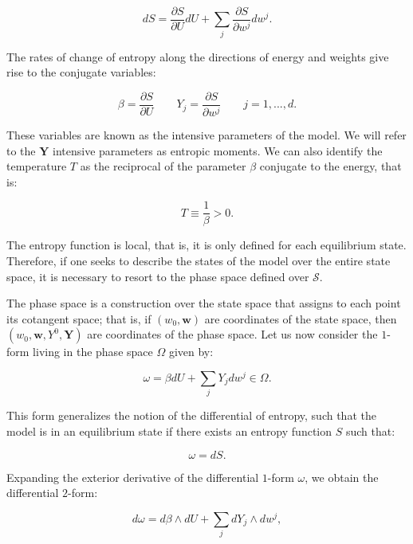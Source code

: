 \documentclass[12pt]{article}
\begin{document}
\begin{equation}
dS = \frac{\partial S}{\partial U} dU + \sum_{j} \frac{\partial S}{\partial w^{j}}dw^{j}.
\end{equation}

The rates of change of entropy along the directions of energy and weights give rise to the conjugate variables:

\begin{equation}
\beta = \frac{\partial S}{\partial U} \qquad Y_{j} = \frac{\partial S}{\partial w^{j}} \qquad j = 1,...,d.
\end{equation}

These variables are known as the intensive parameters of the model. We will refer to the $\mathbf{Y}$ intensive parameters as entropic moments. We can also identify the temperature $T$ as the reciprocal of the parameter $\beta$ conjugate to the energy, that is:

\begin{equation}
T \equiv \frac{1}{\beta} > 0.
\end{equation}

The entropy function is local, that is, it is only defined for each equilibrium state. Therefore, if one seeks to describe the states of the model over the entire state space, it is necessary to resort to the phase space \cite{arnold_mechanics} defined over $\mathcal{S}$. 

The phase space is a construction over the state space that assigns to each point its cotangent space; that is, if $(w_0, \mathbf{w})$ are coordinates of the state space, then $(w_0, \mathbf{w},Y^0, \mathbf{Y})$ are coordinates of the phase space. Let us now consider the $1$-form living in the phase space $\Omega$ given by:

\begin{equation}
\omega = \beta dU + \sum_{j} Y_{j} dw^{j} \in \Omega.
\end{equation}

This form generalizes the notion of the differential of entropy, such that the model is in an equilibrium state if there exists an entropy function $S$ such that:

\begin{equation}
\omega = dS.
\end{equation}

Expanding the exterior derivative of the differential $1$-form $\omega$, we obtain the differential $2$-form:

\begin{equation}
d\omega = d\beta \wedge dU + \sum_{j} dY_{j} \wedge dw^{j},
\end{equation}
\end{document}

